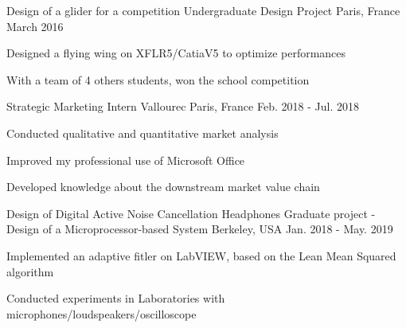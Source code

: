 \begin{cventries}
  \cventry
    {Design of a glider for a competition}
    {Undergraduate Design Project}
    {Paris, France}
    {March 2016}
    {
      \begin{cvitems}
        \item {Designed a flying wing on XFLR5/CatiaV5 to optimize performances }
        \item {With a team of 4 others students, won the school competition}
      \end{cvitems}
    }
    \cventry
    {Strategic Marketing Intern}
    {Vallourec}
    {Paris, France}
    {Feb. 2018 - Jul. 2018}
    {
      \begin{cvitems}
        \item {Conducted qualitative and quantitative market analysis }
        \item {Improved my professional use of Microsoft Office}
        \item {Developed knowledge about the downstream market value chain}
      \end{cvitems}
    }
    
     \cventry
    {Design of Digital Active Noise Cancellation Headphones}
    {Graduate project - Design of a Microprocessor-based System  }
    {Berkeley, USA}
    {Jan. 2018 - May. 2019}
    {
      \begin{cvitems}
        \item {Implemented an adaptive fitler on LabVIEW, based on the Lean Mean Squared algorithm}
        \item {Conducted experiments in Laboratories with microphones/loudspeakers/oscilloscope}
      \end{cvitems}
    }
\end{cventries}
